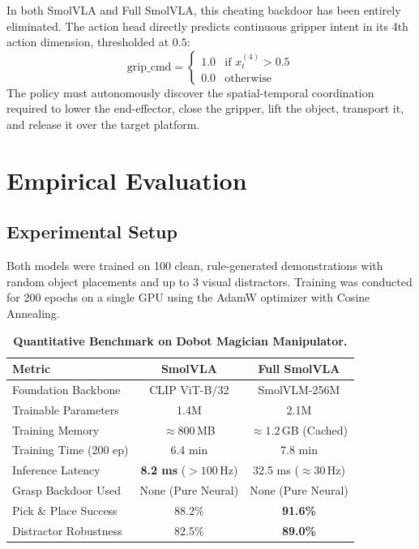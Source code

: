 \documentclass[10pt,twocolumn,letterpaper]{article}
\begin{document}
In both SmolVLA and Full SmolVLA, this cheating backdoor has been entirely eliminated. The action head directly predicts continuous gripper intent in its 4th action dimension, thresholded at $0.5$:
\begin{equation}
\text{grip\_cmd} = 
\begin{cases}
1.0 & \text{if } x_t^{(4)} > 0.5 \\
0.0 & \text{otherwise}
\end{cases}
\end{equation}
The policy must autonomously discover the spatial-temporal coordination required to lower the end-effector, close the gripper, lift the object, transport it, and release it over the target platform.

\section{Empirical Evaluation}

\subsection{Experimental Setup}
Both models were trained on 100 clean, rule-generated demonstrations with random object placements and up to 3 visual distractors. Training was conducted for 200 epochs on a single GPU using the AdamW optimizer with Cosine Annealing.

\begin{table}[h]
\centering
\small
\begin{tabular}{lcc}
\toprule
\textbf{Metric} & \textbf{SmolVLA} & \textbf{Full SmolVLA} \\
\midrule
Foundation Backbone & CLIP ViT-B/32 & SmolVLM-256M \\
Trainable Parameters & 1.4M & 2.1M \\
Training Memory & $\approx 800\,$MB & $\approx 1.2\,$GB (Cached) \\
Training Time (200 ep) & 6.4 min & 7.8 min \\
Inference Latency & \textbf{8.2 ms} ($>100\,$Hz) & 32.5 ms ($\approx 30\,$Hz) \\
Grasp Backdoor Used & None (Pure Neural) & None (Pure Neural) \\
Pick \& Place Success & 88.2\% & \textbf{91.6\%} \\
Distractor Robustness & 82.5\% & \textbf{89.0\%} \\
\bottomrule
\end{tabular}
\caption{\textbf{Quantitative Benchmark on Dobot Magician Manipulator.}}
\label{tab:results}
\end{table}
\end{document}
